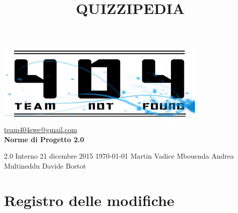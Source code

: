 \documentclass[a4paper,11pt]{article}
\title{\textbf{{\fontsize{8mm}{5mm}\selectfont QUIZZIPEDIA}}}
\date{}
\author{}
\begin{document}
	\maketitle
	\thispagestyle{empty}
	\begin{center}
	\includegraphics{../../team_not_found.jpg}\\
	\fontsize{5mm}{3mm}\url{team404swe@gmail.com}\\
	
	\vspace{50mm}
	\textbf{Norme di Progetto 2.0}	
	\end{center}
	
			{2.0} 							%
			{Interno} 						%
			{21 dicembre 2015} 				%
			{\today} 						%
			{Martin Vadice Mbouenda}		%
			{Andrea Multineddu} 			%
			{Davide Bortot} 				%
	\newpage
	\null
	\thispagestyle{empty}
	
	\newpage	
	\newpage
	\fancyfoot[R]{\thepage}
	
	\hspace{30 mm}
	\section*{Registro delle modifiche}
		\beginregistro
		
\end{document}
